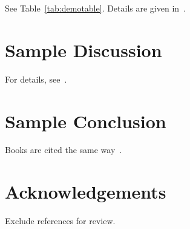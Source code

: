 \documentclass{article}
\begin{document}
See Table~\ref{tab:demotable}. \lipsum[5] Details are given in~.

\section{Sample Discussion}

\lipsum[6] For details, see~.

\section{Sample Conclusion}
\lipsum[7] Books are cited the same way~\cite{aoett}.

\section*{Acknowledgements}
Exclude references for review.



\end{document}
